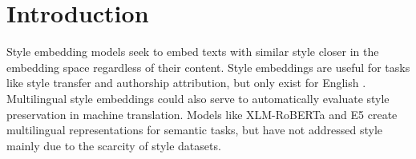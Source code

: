 \section{Introduction}
\label{sec:introduction}

\mainfig

Style embedding models seek to embed texts with similar style closer in the embedding space regardless of their content. Style embeddings are useful for tasks like style transfer and authorship attribution, but only exist for English \citep{styleemb,patel2024styledistancestrongercontentindependentstyle}. Multilingual style embeddings could also serve to automatically evaluate style preservation in machine translation. Models like XLM-RoBERTa \citep{Conneau2019UnsupervisedCR} and E5 \citep{wang2024multilinguale5textembeddings} create multilingual representations for semantic tasks, but have not addressed style mainly due to the scarcity of style datasets.



